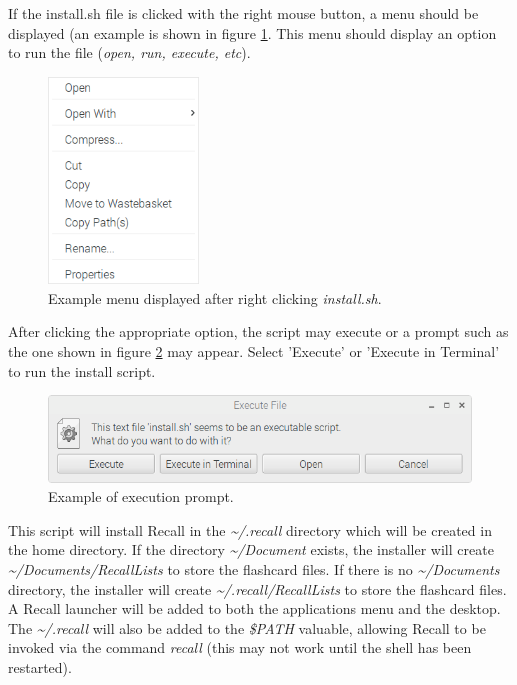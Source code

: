 \documentclass[letterpaper]{article}
\begin{document}
If the install.sh file is clicked with the right mouse button, a menu should be displayed (an example is shown in figure \ref{fig:graphical_execution_menu}. This menu should display an option to run the file (\textit{open, run, execute, etc}).

\begin{figure}[H]
  \centering
  \includegraphics[width=4cm]{images/graphical_install/execution_menu.png}
  \caption{Example menu displayed after right clicking \textit{install.sh}.}
  \label{fig:graphical_execution_menu}
\end{figure}

After clicking the appropriate option, the script may execute or a prompt such as the one shown in figure \ref{fig:graphical_execution_window} may appear. Select 'Execute' or 'Execute in Terminal' to run the install script.

\begin{figure}[h]
  \centering
  \includegraphics[width=14cm]{images/graphical_install/execution_window.png}
  \caption{Example of execution prompt.}
  \label{fig:graphical_execution_window}
\end{figure}

This script will install Recall in the \textit{\~{}/.recall} directory which will be created in the home directory. If the directory \textit{\~{}/Document} exists, the installer will create \textit{\~{}/Documents/RecallLists} to store the flashcard files. If there is no \textit{\~{}/Documents} directory, the installer will create \textit{\~{}/.recall/RecallLists} to store the flashcard files. A Recall launcher will be added to both the applications menu and the desktop. The \textit{\~{}/.recall} will also be added to the \textit{\$PATH} valuable, allowing Recall to be invoked via the command \textit{recall} (this may not work until the shell has been restarted).
\end{document}
